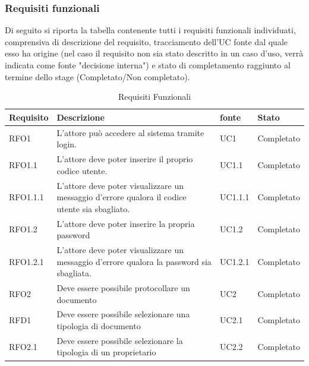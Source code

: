 \subsubsection{Requisiti funzionali}
Di seguito si riporta la tabella contenente tutti i requisiti funzionali individuati, comprensiva di descrizione del requisito, tracciamento dell'UC fonte dal quale esso ha origine (nel caso il requisito non sia stato descritto in un caso d'uso, verrà indicata come fonte "decisione interna") e stato di completamento raggiunto al termine dello stage (Completato/Non completato).
    \renewcommand{\arraystretch}{1.5}%
    \begin{longtable}{| p{3cm} | p{6cm} | p{3cm} | p{3cm} |}
        \caption[Requisiti Funzionali]{Requisiti Funzionali}
        \label{tabella:req0}
        \endlastfoot
        \hline
        \textbf{Requisito} & \textbf{Descrizione} & \textbf{fonte} & \textbf{Stato}\\
        \hline
        \endhead
        RFO1 & L'attore può accedere al sistema tramite login. & UC1 & Completato
        \\ \hline
        
        RFO1.1 & L'attore deve poter inserire il proprio codice utente. & UC1.1 & Completato
        \\ \hline
        
        RFO1.1.1 & L'attore deve poter visualizzare un messaggio d'errore qualora il codice utente sia sbagliato. & UC1.1.1 & Completato
        \\ \hline
        
        RFO1.2 & L'attore deve poter inserire la propria password & UC1.2 & Completato
        \\ \hline
        
        RFO1.2.1 & L'attore deve poter visualizzare un messaggio d'errore qualora la password sia sbagliata. & UC1.2.1 & Completato
        \\ \hline
        
        RFO2 & Deve essere possibile protocollare un documento & UC2 & Completato
        \\ \hline
        
        RFD1 & Deve essere possibile selezionare una tipologia di documento & UC2.1 & Completato
        \\ \hline
        
        RFO2.1 & Deve essere possibile selezionare la tipologia di un proprietario & UC2.2 & Completato
        \\ \hline
        

\end{longtable}
